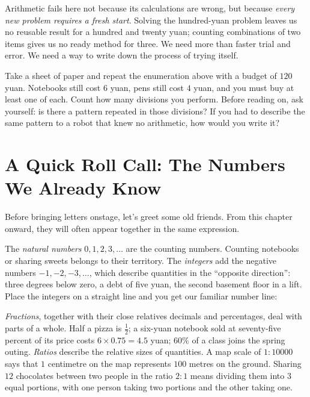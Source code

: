 Arithmetic fails here not because its calculations are wrong, but because \emph{every new problem requires a fresh start}. Solving the hundred-yuan problem leaves us no reusable result for a hundred and twenty yuan; counting combinations of two items gives us no ready method for three. We need more than faster trial and error. We need a way to write down the process of trying itself.

\begin{shiyan}
Take a sheet of paper and repeat the enumeration above with a budget of $120$ yuan. Notebooks still cost $6$ yuan, pens still cost $4$ yuan, and you must buy at least one of each. Count how many divisions you perform. Before reading on, ask yourself: is there a pattern repeated in those divisions? If you had to describe the same pattern to a robot that knew no arithmetic, how would you write it?
\end{shiyan}

\section{A Quick Roll Call: The Numbers We Already Know}

Before bringing letters onstage, let's greet some old friends. From this chapter onward, they will often appear together in the same expression.

The \emph{natural numbers} $0,1,2,3,\dots$ are the counting numbers. Counting notebooks or sharing sweets belongs to their territory. The \emph{integers} add the negative numbers $-1,-2,-3,\dots$, which describe quantities in the ``opposite direction'': three degrees below zero, a debt of five yuan, the second basement floor in a lift. Place the integers on a straight line and you get our familiar number line:

\begin{center}
\end{center}

\emph{Fractions}, together with their close relatives decimals and percentages, deal with parts of a whole. Half a pizza is $\frac{1}{2}$; a six-yuan notebook sold at seventy-five percent of its price costs $6\times 0.75=4.5$ yuan; $60\%$ of a class joins the spring outing. \emph{Ratios} describe the relative sizes of quantities. A map scale of $1:10000$ says that $1$ centimetre on the map represents $100$ metres on the ground. Sharing $12$ chocolates between two people in the ratio $2:1$ means dividing them into $3$ equal portions, with one person taking two portions and the other taking one.

